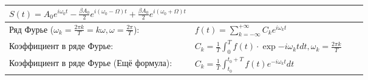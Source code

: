 \documentclass{article}
\begin{document}
\begin{tabular}{ |p{6cm}|p{3cm}|p{6cm}|p{3.5cm}|  }
$S(t)=A_{0} e^{i \omega_{0} t}-\frac{\beta A_{0}}{2} e^{i\left(\omega_{0}-\Omega\right) t}+\frac{\beta A_{0}}{2} e^{i\left(\omega_{0}+\Omega\right) t}$&
&
\\
\hline
Ряд Фурье ($\omega_{k}=\frac{2 \pi k}{T}=k \omega, \omega=\frac{2 \pi}{T}$):&
$f(t)=\sum_{k=-\infty}^{+\infty} C_{k} e^{i \omega_{k} t}$&
&
\\
\hline
Коэффициент в ряде Фурье: &
$C_{k}=\frac{1}{T} \int_{0}^{T} f(t) \cdot \exp{-i \omega_{k} t} d t, \omega_{k}=\frac{2 \pi k}{T}$&
&
\\
\hline
Коэффициент в ряде Фурье (Ещё формула): &
$C_{k}=\frac{1}{T} \int_{t_{0}}^{t_{0}+T} f(t) e^{-i \omega_{k} t} d t$ &
&
\\
\hline
\end{tabular}
\end{document}

